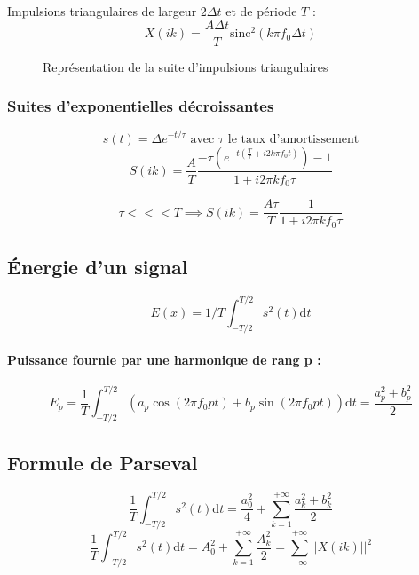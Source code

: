 \documentclass[a4paper,12pt]{article}
\begin{document}
Impulsions triangulaires de largeur $2\Delta t$ et de période $T$ :
\[ X(ik) = \dfrac{A\Delta t}{T} \mathrm{sinc}^2(k\pi f_0 \Delta t) \]

\begin{figure}[!htbp]
	\centering
	\caption{Représentation de la suite d'impulsions triangulaires}
\end{figure}

\subsubsection{Suites d'exponentielles décroissantes}

\[ s(t) = \Delta e^{-t/\tau} \text{ avec } \tau \text{ le taux d'amortissement} \]
\[ S(ik) = \dfrac{A}{T} \dfrac{-\tau (e^{-t(\frac{T}{\tau}+i2k\pi f_0 t)})-1}{1+i2\pi kf_0 \tau} \]

 \[ \tau <<< T \implies S(ik) = \dfrac{A\tau}{T} \dfrac{1}{1+i2\pi kf_0 \tau} \]

\subsection{Énergie d'un signal}
\[ E(x) = 1/T \int_{-T/2}^{T/2} s^2(t) \mathrm{d}t \]

\paragraph{Puissance fournie par une harmonique de rang p :}
\[ E_p = \dfrac{1}{T} \int_{-T/2}^{T/2}(a_p \cos(2\pi f_0 pt) + b_p \sin(2\pi f_0 pt)) \mathrm{d}t = \dfrac{a_p^2 + b_p^2}{2} \]

\subsection{Formule de Parseval}

\begin{defi}
    \[ \dfrac{1}{T} \int_{-T/2}^{T/2} s^2(t) \mathrm{d}t = \dfrac{a_0^2}{4} + \sum_{k=1}^{+\infty} \dfrac{a_k^2 + b_k^2}{2} \]
    \[ \dfrac{1}{T} \int_{-T/2}^{T/2} s^2(t) \mathrm{d}t = A_0^2 + \sum_{k=1}^{+\infty} \dfrac{A_k^2}{2} = \sum_{-\infty}^{+\infty} ||X(ik)||^2 \]
\end{defi}
\end{document}
